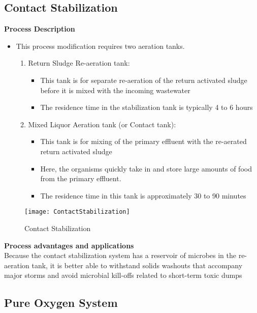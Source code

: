 \subsection{Contact Stabilization}

\textbf{Process Description}
\begin{itemize}
\item This process modification requires two aeration tanks. 
\begin{enumerate}
\item Return Sludge Re-aeration tank:\\
\begin{itemize}
\item This tank is for separate re-aeration of the return activated sludge before it is mixed with the incoming wastewater
\item The residence time in the stabilization tank is typically 4 to 6 hours
\end{itemize}
\item Mixed Liquor Aeration tank (or Contact tank):\\
\begin{itemize}
\item This tank is for mixing of the primary effluent with the re-aerated return activated sludge
\item Here, the organisms quickly take in and store large amounts of food from the primary effluent.
\item The residence time in this tank is approximately 30 to 90 minutes
\end{itemize} 
\end{enumerate}
\end{itemize} 

\begin{figure}[h!]
\begin{center}
\texttt{[image: ContactStabilization]}
\caption{Contact Stabilization}
\end{center}
\end{figure}


\noindent \textbf{Process advantages and applications}\\
Because the contact stabilization system has a reservoir of microbes in the re-aeration tank, it is better able to withstand solids washouts that accompany major storms and avoid microbial kill-offs related to short-term toxic dumps



\subsection{Pure Oxygen System}

